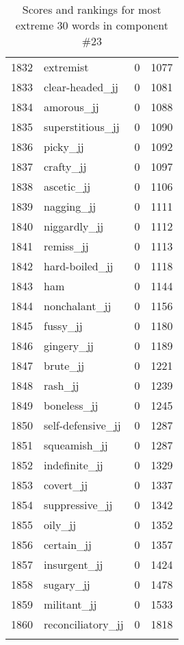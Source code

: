 \begin{longtable}[!htbp]{| rlr@{.}l |}
    1832 & extremist & 0 & 1077 \\
    1833 & clear-headed\_jj & 0 & 1081 \\
    1834 & amorous\_jj & 0 & 1088 \\
    1835 & superstitious\_jj & 0 & 1090 \\
    1836 & picky\_jj & 0 & 1092 \\
    1837 & crafty\_jj & 0 & 1097 \\
    1838 & ascetic\_jj & 0 & 1106 \\
    1839 & nagging\_jj & 0 & 1111 \\
    1840 & niggardly\_jj & 0 & 1112 \\
    1841 & remiss\_jj & 0 & 1113 \\
    1842 & hard-boiled\_jj & 0 & 1118 \\
    1843 & ham & 0 & 1144 \\
    1844 & nonchalant\_jj & 0 & 1156 \\
    1845 & fussy\_jj & 0 & 1180 \\
    1846 & gingery\_jj & 0 & 1189 \\
    1847 & brute\_jj & 0 & 1221 \\
    1848 & rash\_jj & 0 & 1239 \\
    1849 & boneless\_jj & 0 & 1245 \\
    1850 & self-defensive\_jj & 0 & 1287 \\
    1851 & squeamish\_jj & 0 & 1287 \\
    1852 & indefinite\_jj & 0 & 1329 \\
    1853 & covert\_jj & 0 & 1337 \\
    1854 & suppressive\_jj & 0 & 1342 \\
    1855 & oily\_jj & 0 & 1352 \\
    1856 & certain\_jj & 0 & 1357 \\
    1857 & insurgent\_jj & 0 & 1424 \\
    1858 & sugary\_jj & 0 & 1478 \\
    1859 & militant\_jj & 0 & 1533 \\
    1860 & reconciliatory\_jj & 0 & 1818 \\
    \hline
    \caption{Scores and rankings for most extreme 30 words in component \#23} \\
\end{longtable}
